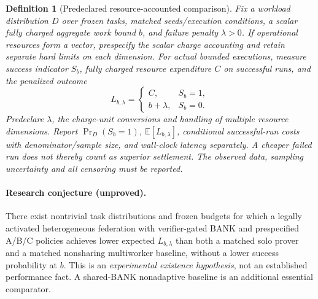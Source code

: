 \documentclass[11pt,letterpaper]{article}
\newtheorem{definition}{Definition}[section]
\theoremstyle{remark}
\begin{document}
\begin{definition}[Predeclared resource-accounted comparison]\label{def:experiment}
Fix a workload distribution $D$ over frozen tasks, matched seeds/execution conditions, a \emph{scalar} fully charged aggregate work bound $b$, and failure penalty $\lambda>0$. If operational resources form a vector, prespecify the scalar charge accounting and retain separate hard limits on each dimension. For actual bounded executions, measure success indicator $S_b$, fully charged resource expenditure $C$ on successful runs, and the penalized outcome
\[L_{b,\lambda}=\begin{cases}C,&S_b=1,\\ b+\lambda,&S_b=0.\end{cases}\]
Predeclare $\lambda$, the charge-unit conversions and handling of multiple resource dimensions. Report $\Pr_D(S_b=1)$, $\mathbb E[L_{b,\lambda}]$, conditional successful-run costs with denominator/sample size, and wall-clock latency separately. A cheaper failed run does not thereby count as superior settlement. The observed data, sampling uncertainty and all censoring must be reported.
\end{definition}
\paragraph{Research conjecture (unproved).} There exist nontrivial task distributions and frozen budgets for which a legally activated heterogeneous federation with verifier-gated BANK and prespecified A/B/C policies achieves lower expected $L_{b,\lambda}$ than both a matched solo prover and a matched nonsharing multiworker baseline, without a lower success probability at $b$. This is an \emph{experimental existence hypothesis}, not an established performance fact. A shared-BANK nonadaptive baseline is an additional essential comparator.
\end{document}
